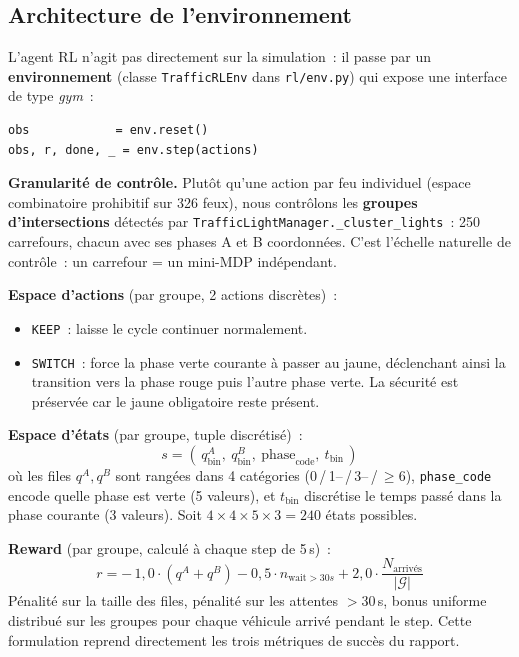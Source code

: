 \documentclass[a4paper,10pt]{article}
\begin{document}
\subsection{Architecture de l'environnement}

L'agent RL n'agit pas directement sur la simulation~: il passe par un
\textbf{environnement} (classe \texttt{TrafficRLEnv} dans \texttt{rl/env.py})
qui expose une interface de type \emph{gym}~:
\begin{lstlisting}
obs            = env.reset()
obs, r, done, _ = env.step(actions)
\end{lstlisting}

\textbf{Granularit\'{e} de contr\^{o}le.}
Plut\^{o}t qu'une action par feu individuel
(espace combinatoire prohibitif sur 326 feux), nous contr\^{o}lons les
\textbf{groupes d'intersections} d\'{e}tect\'{e}s par
\texttt{TrafficLightManager.\_cluster\_lights}~: 250 carrefours, chacun
avec ses phases A et B coordonn\'{e}es. C'est l'\'{e}chelle naturelle de
contr\^{o}le~: un carrefour = un mini-MDP ind\'{e}pendant.

\textbf{Espace d'actions} (par groupe, 2 actions discr\`{e}tes)~:
\begin{itemize}[leftmargin=1.5em,itemsep=0pt]
  \item \texttt{KEEP}~: laisse le cycle continuer normalement.
  \item \texttt{SWITCH}~: force la phase verte courante \`{a} passer au jaune,
        d\'{e}clenchant ainsi la transition vers la phase rouge puis l'autre
        phase verte. La s\'{e}curit\'{e} est pr\'{e}serv\'{e}e car le jaune obligatoire
        reste pr\'{e}sent.
\end{itemize}

\textbf{Espace d'\'{e}tats} (par groupe, tuple discr\'{e}tis\'{e})~:
\[
  s = (\,q^A_{\text{bin}},\ q^B_{\text{bin}},\ \text{phase}_{\text{code}},\ t_{\text{bin}}\,)
\]
o\`{u} les files $q^A, q^B$ sont rang\'{e}es dans 4 cat\'{e}gories
(0\,/\,1\!--\,/\,3\!--\,/\,$\geq 6$), \texttt{phase\_code} encode
quelle phase est verte (5 valeurs), et $t_{\text{bin}}$ discr\'{e}tise
le temps pass\'{e} dans la phase courante (3 valeurs). Soit
$4 \times 4 \times 5 \times 3 = 240$ \'{e}tats possibles.

\textbf{Reward} (par groupe, calcul\'{e} \`{a} chaque step de 5\,s)~:
\[
  r = -\,1{,}0\cdot(q^A + q^B) - 0{,}5\cdot n_{\text{wait}>30s}
       + 2{,}0\cdot \frac{N_{\text{arriv\'{e}s}}}{|\mathcal{G}|}
\]
P\'{e}nalit\'{e} sur la taille des files, p\'{e}nalit\'{e} sur les attentes
$>30$\,s, bonus uniforme distribu\'{e} sur les groupes pour chaque
v\'{e}hicule arriv\'{e} pendant le step. Cette formulation reprend
directement les trois m\'{e}triques de succ\`{e}s du rapport.
\end{document}
